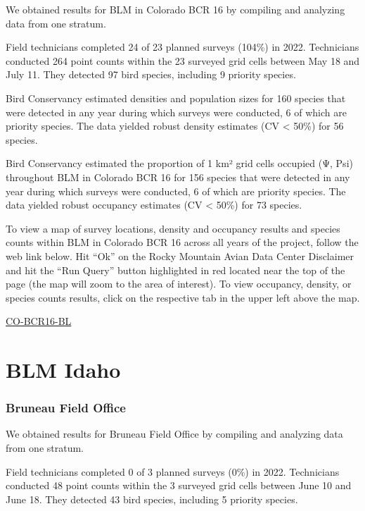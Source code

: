 \documentclass[
  letterpaper,
  DIV=11,
  numbers=noendperiod,
  oneside]{scrreprt}
\begin{document}
We obtained results for BLM in Colorado BCR 16 by compiling and
analyzing data from one stratum.

Field technicians completed 24 of 23 planned surveys (104\%) in 2022.
Technicians conducted 264 point counts within the 23 surveyed grid cells
between May 18 and July 11. They detected 97 bird species, including 9
priority species.

Bird Conservancy estimated densities and population sizes for 160
species that were detected in any year during which surveys were
conducted, 6 of which are priority species. The data yielded robust
density estimates (CV \textless{} 50\%) for 56 species.

Bird Conservancy estimated the proportion of 1 km² grid cells occupied
(Ψ, Psi) throughout BLM in Colorado BCR 16 for 156 species that were
detected in any year during which surveys were conducted, 6 of which are
priority species. The data yielded robust occupancy estimates (CV
\textless{} 50\%) for 73 species.

To view a map of survey locations, density and occupancy results and
species counts within BLM in Colorado BCR 16 across all years of the
project, follow the web link below. Hit ``Ok'' on the Rocky Mountain
Avian Data Center Disclaimer and hit the ``Run Query'' button
highlighted in red located near the top of the page (the map will zoom
to the area of interest). To view occupancy, density, or species counts
results, click on the respective tab in the upper left above the map.

\href{http://www.rmbo.org/new_site/adc/QueryWindow.aspx\#N4IgzgLgTghhCuBbEAuABCAwgeQLQCFMAlARgDYCAZdfeKAUxnjQHsAzNSmAOwBM0AsjxgBzeonrcIIAL5A=}{CO-BCR16-BL}

\hypertarget{blm-idaho}{%
\section{BLM Idaho}\label{blm-idaho}}

\hypertarget{bruneau-field-office}{%
\subsubsection{Bruneau Field Office}\label{bruneau-field-office}}

We obtained results for Bruneau Field Office by compiling and analyzing
data from one stratum.

Field technicians completed 0 of 3 planned surveys (0\%) in 2022.
Technicians conducted 48 point counts within the 3 surveyed grid cells
between June 10 and June 18. They detected 43 bird species, including 5
priority species.
\end{document}
